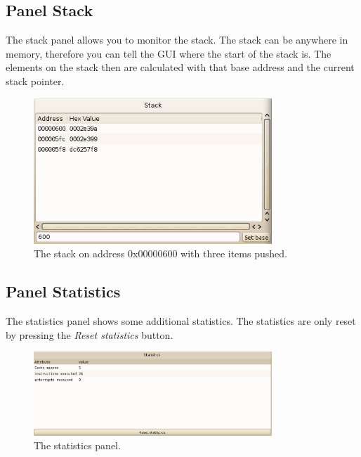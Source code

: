 \subsection{Panel Stack}
The stack panel allows you to monitor the stack. The stack can be anywhere in memory, therefore you can tell the GUI where the start of the stack is. The elements on the stack then are calculated with that base address and the current stack pointer.
\begin{figure}[H]
\begin{center}
	\includegraphics[width=0.8\textwidth]{./files/emu_gui_stack.png}
\end{center}
	\caption{The stack on address 0x00000600 with three items pushed.}
\end{figure}

\subsection{Panel Statistics}
The statistics panel shows some additional statistics. The statistics are only  reset by pressing the \emph{Reset statistics} button.
\begin{figure}[H]
\begin{center}
	\includegraphics[width=0.8\textwidth]{./files/emu_gui_statistics.png}
\end{center}
	\caption{The statistics panel.}
\end{figure}

